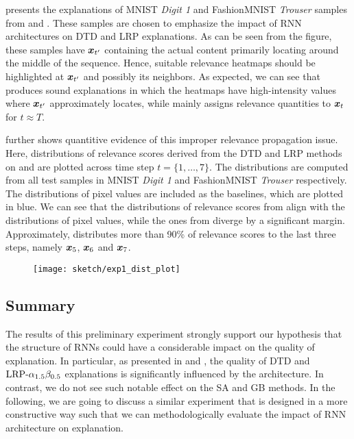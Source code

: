 \addfigure{\ref{fig:class_1_comparison}} presents the explanations of MNIST \textit{Digit 1} and FashionMNIST \textit{Trouser} samples from  and . These samples are chosen to emphasize the impact of RNN architectures on DTD and LRP explanations. As can be seen from the figure, these samples have $\boldsymbol{x}_{t'}$ containing the actual content primarily locating around the middle of the sequence. Hence, suitable relevance heatmaps should be highlighted at $\boldsymbol{x}_{t'}$ and possibly its neighbors.  As expected, we can see that  produces sound explanations in which the heatmaps have high-intensity values where $\boldsymbol{x}_{t'}$ approximately locates, while  mainly assigns relevance quantities to $\boldsymbol{x}_{t}$ for $t \approx T$. 

\addfigure{\ref{fig:exp1_dist_plot}} further shows quantitive evidence of this improper relevance propagation issue. Here, distributions of relevance scores derived from the DTD and LRP methods on  and  are plotted across time step $t = \{ 1, \dots, 7 \}$. The distributions are computed from all test samples in MNIST \textit{Digit 1} and FashionMNIST \textit{Trouser} respectively. The distributions of pixel values are included as the baselines, which are plotted in blue.  We can see that the distributions of relevance scores from  align with the distributions of pixel values, while  the ones from   diverge by a significant margin. Approximately,  distributes more than 90\% of relevance scores to the last three steps, namely $\boldsymbol{x}_5$, $\boldsymbol{x}_6$ and $\boldsymbol{x}_7$.


 \begin{figure}[!htb]
\centering
\texttt{[image: sketch/exp1\_dist\_plot]}
\label{fig:exp1_dist_plot}
\end{figure}

\subsection{Summary}
The results of this preliminary experiment strongly support our hypothesis that the structure of RNNs could have a considerable impact on the quality of  explanation.  In particular,  as presented in \addfigure{\ref{fig:class_1_comparison}} and \addfigure{\ref{fig:exp1_dist_plot}}, the quality of DTD and $\text{LRP-}\alpha_{1.5}\beta_{0.5}$ explanations is significantly influenced by the architecture. In contrast, we do not see such notable effect on the SA and GB methods.  In the following, we are going to discuss a similar experiment that is designed in a more constructive way such that we can methodologically evaluate the impact of RNN architecture on explanation.


